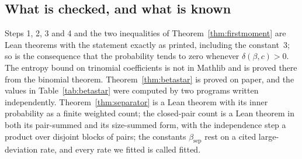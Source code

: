 \subsection{What is checked, and what is known}

Steps 1, 2, 3 and 4 and the two inequalities of Theorem~\ref{thm:firstmoment}
are Lean theorems with the statement exactly as printed, including the
constant~3; so is the consequence that the probability tends to zero whenever
$\delta(\beta,c)>0$. The entropy bound on trinomial coefficients is not in
Mathlib and is proved there from the binomial theorem. Theorem~\ref{thm:betastar}
is proved on paper, and the values in Table~\ref{tab:betastar} were computed
by two programs written independently. Theorem~\ref{thm:separator} is a Lean
theorem with its inner probability as a finite weighted count; the
closed-pair count is a Lean theorem in both its pair-summed and its
size-summed form, with the independence step a product over disjoint blocks
of pairs; the constants
$\beta_{\mathrm{sep}}$ rest on a cited large-deviation rate, and every rate we
fitted is called fitted.

